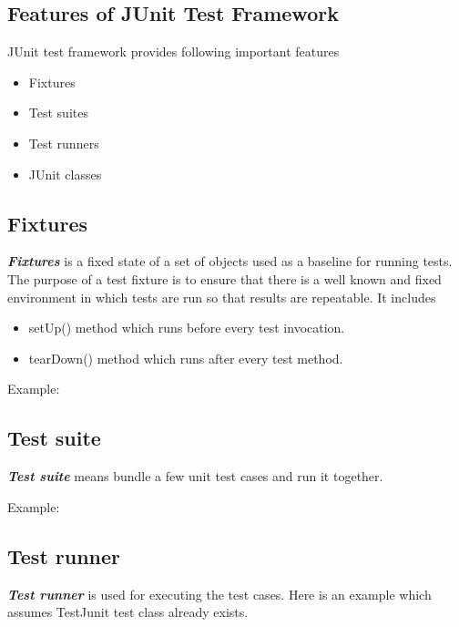 \documentclass[11pt,a4paper]{article}
\begin{document}
\subsection*{Features of JUnit Test Framework}
JUnit test framework provides following important features
\begin{itemize}
\item Fixtures
\item Test suites
\item Test runners
\item JUnit classes
\end{itemize}

\subsection*{Fixtures}

\emph{\textbf{Fixtures}} is a fixed state of a set of objects used as a baseline for running tests. The purpose of a test fixture is to ensure that there is a well known and fixed environment in which tests are run so that results are repeatable. It includes
\begin{itemize}
\item setUp() method which runs before every test invocation.
\item tearDown() method which runs after every test method.
\end{itemize}
Example:



\subsection*{Test suite}
\emph{\textbf{Test suite}} means bundle a few unit test cases and run it together.

Example:








\subsection*{Test runner}
\emph{\textbf{Test runner}} is used for executing the test cases. Here is an example which assumes TestJunit test class already exists.


\end{document}
